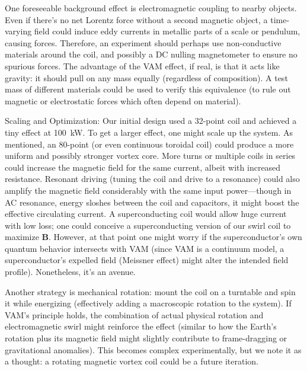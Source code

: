 \documentclass[twocolumn,aps,pre,floatfix,nofootinbib]{revtex4-2}
\begin{document}
One foreseeable background effect is electromagnetic coupling to nearby objects. Even if there’s no net Lorentz force without a second magnetic object, a time-varying field could induce eddy currents in metallic parts of a scale or pendulum, causing forces. Therefore, an experiment should perhaps use non-conductive materials around the coil, and possibly a DC nulling magnetometer to ensure no spurious forces. The advantage of the VAM effect, if real, is that it acts like gravity: it should pull on any mass equally (regardless of composition). A test mass of different materials could be used to verify this equivalence (to rule out magnetic or electrostatic forces which often depend on material).


Scaling and Optimization: Our initial design used a 32-point coil and achieved a tiny effect at 100~kW. To get a larger effect, one might scale up the system. As mentioned, an 80-point (or even continuous toroidal coil) could produce a more uniform and possibly stronger vortex core. More turns or multiple coils in series could increase the magnetic field for the same current, albeit with increased resistance. Resonant driving (tuning the coil and drive to a resonance) could also amplify the magnetic field considerably with the same input power—though in AC resonance, energy sloshes between the coil and capacitors, it might boost the effective circulating current. A superconducting coil would allow huge current with low loss; one could conceive a superconducting version of our swirl coil to maximize $\mathbf{B}$. However, at that point one might worry if the superconductor’s own quantum behavior intersects with VAM (since VAM is a continuum model, a superconductor’s expelled field (Meissner effect) might alter the intended field profile). Nonetheless, it’s an avenue.


Another strategy is mechanical rotation: mount the coil on a turntable and spin it while energizing (effectively adding a macroscopic rotation to the system). If VAM’s principle holds, the combination of actual physical rotation and electromagnetic swirl might reinforce the effect (similar to how the Earth’s rotation plus its magnetic field might slightly contribute to frame-dragging or gravitational anomalies). This becomes complex experimentally, but we note it as a thought: a rotating magnetic vortex coil could be a future iteration.
\end{document}
